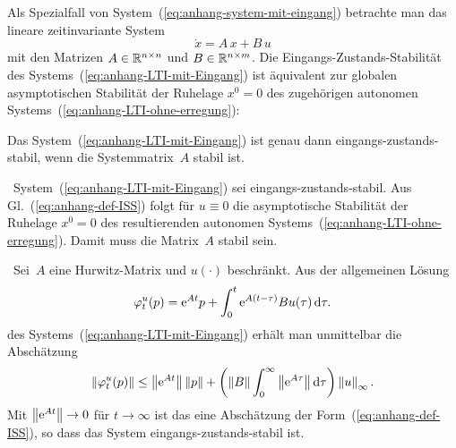 \medskip{}

Als Spezialfall von System~(\ref{eq:anhang-system-mit-eingang})
betrachte man das lineare zeit\-invariante System
\begin{equation}
\dot{x}=A\,x+B\,u\label{eq:anhang-LTI-mit-Eingang}
\end{equation}
mit den Matrizen $A\in{\mathbb{R}}^{n\times n}$ und $B\in{\mathbb{R}}^{n\times m}$.
Die Eingangs-Zustands-Stabilität des Systems~(\ref{eq:anhang-LTI-mit-Eingang})
ist äquivalent zur globalen asymptotischen Stabilität der Ruhelage
$x^{0}=0$ des zugehörigen autonomen Systems~(\ref{eq:anhang-LTI-ohne-erregung}):
\begin{theorem}
Das System~(\ref{eq:anhang-LTI-mit-Eingang}) ist genau dann eingangs-zustands-stabil,
wenn die Systemmatrix~$A$ stabil ist.
\end{theorem}
\begin{svmultproof2}
\hinreichend\ System~(\ref{eq:anhang-LTI-mit-Eingang}) sei eingangs-zustands-stabil.
Aus Gl.~(\ref{eq:anhang-def-ISS}) folgt für $u\equiv0$ die asymptotische
Stabilität der Ruhelage $x^{0}=0$ des resultierenden autonomen Systems~(\ref{eq:anhang-LTI-ohne-erregung}).
Damit muss die Matrix~$A$ stabil sein.

\notwendig\ Sei~$A$ eine Hurwitz-Matrix und $u(\cdot)$ beschränkt.
Aus der allgemeinen Lösung
\[
\varphi_{t}^{u}(p)={\mathrm{e}}^{At}p+\int_{0}^{t}{\mathrm{e}}^{A(t-\tau)}Bu(\tau)\,{\mathrm{d}}\tau.
\]
des Systems~(\ref{eq:anhang-LTI-mit-Eingang}) erhält man unmittelbar
die Abschätzung
\[
\left\Vert \varphi_{t}^{u}(p)\right\Vert \leq\left\Vert {\mathrm{e}}^{At}\right\Vert \left\Vert p\right\Vert +\left(\left\Vert B\right\Vert \int_{0}^{\infty}\left\Vert {\mathrm{e}}^{A\tau}\right\Vert {\mathrm{d}}\tau\right)\left\Vert u\right\Vert _{\infty}.
\]
Mit $\left\Vert {\mathrm{e}}^{At}\right\Vert \to0$ für $t\to\infty$ ist das
eine Abschätzung der Form~(\ref{eq:anhang-def-ISS}), so dass das
System eingangs-zustands-stabil ist.
\end{svmultproof2}

